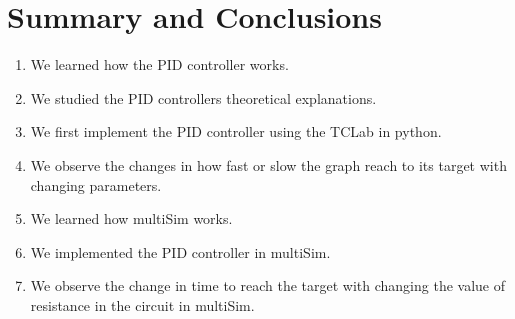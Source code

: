 \chapter{\label{summary}Summary and Conclusions}



\begin{enumerate}
	\item We learned how the PID controller works.
	\item  We studied the PID controllers theoretical explanations.
	\item  We first implement the PID controller using the TCLab in python.
	\item  We observe the changes in how fast or slow the graph reach to its target with changing parameters.
	\item  We learned how multiSim works. 
	\item We implemented the PID controller in multiSim.
	\item  We observe the change in time to reach the target with changing the value of resistance in the circuit in multiSim.
\end{enumerate}

\setcounter{equation}{0}
\setcounter{table}{0}
\setcounter{figure}{0}


    



